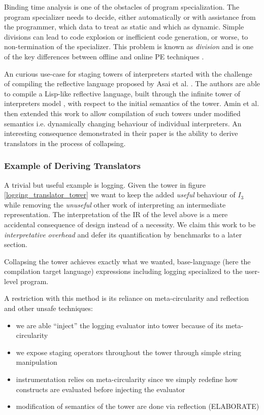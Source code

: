 \documentclass{article}
\begin{document}
Binding time analysis is one of the obstacles of program specialization. The program specializer needs to decide, either automatically or with assistance from the programmer, which data to treat as static and which as dynamic. Simple divisions
can lead to code explosion or inefficient code generation, or worse, to non-termination of the specializer. This problem is known as \textit{division} and is one of the key differences between offline and online PE techniques \cite{jones1993partial}.

An curious use-case for staging towers of interpreters started with the challenge of compiling the reflective language proposed by Asai et al. \cite{asai1997partial, asai2015compiling}. The authors are able to compile a Lisp-like reflective language, built through
the infinite tower of interpreters model \cite{smith1982reflection,wand1988mystery,danvy1988intensions}, with respect to the initial semantics of the tower. Amin et al. \cite{amin2017collapsing} then extended this work to allow compilation of such towers
under modified semantics i.e. dynamically changing behaviour of individual interpreters. An interesting consequence demonstrated in their paper is the ability to derive translators in the process of collapsing.

\subsubsection{Example of Deriving Translators}
A trivial but useful example is logging. Given the tower in figure \ref{logging_translator_tower} we want to keep the added \textit{useful} behaviour of $I_3$ while removing the \textit{unuseful} other work of interpreting an intermediate representation. The interpretation
of the IR of the level above is a mere accidental consequence of design instead of a necessity. We claim this work to be \textit{interpretative overhead} and defer its quantification by benchmarks to a later section.

Collapsing the tower achieves exactly what we wanted, base-language (here the compilation target language) expressions including logging specialized to the user-level program.

A restriction with this method is its reliance on meta-circularity and reflection and other unsafe techniques:
\begin{itemize}
	\item we are able ``inject'' the logging evaluator into tower because of its meta-circularity
	\item we expose staging operators throughout the tower through simple string manipulation
	\item instrumentation relies on meta-circularity since we simply redefine how constructs are evaluated before injecting the evaluator
	\item modification of semantics of the tower are done via reflection (ELABORATE)
\end{itemize}
\end{document}
